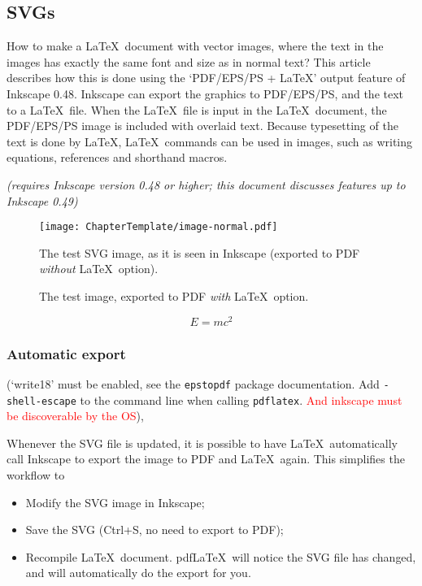 \subsection{SVGs}
How to make a \LaTeX\ document with vector images, where the text in the images
has exactly the same font and size as in normal text? This article describes how
this is done using the `PDF/EPS/PS + LaTeX' output feature of Inkscape 0.48.
Inkscape can export the graphics to PDF/EPS/PS, and the text to a \LaTeX\ file.
When the \LaTeX\ file is input in the \LaTeX\ document, the PDF/EPS/PS image is
included with overlaid text. Because typesetting of the text is done by \LaTeX,
\LaTeX\ commands can be used in images, such as writing equations, references
and shorthand macros.

\emph{(requires Inkscape version 0.48 or higher; this document discusses features up to Inkscape 0.49)}

\begin{figure}
    \centering
      \texttt{[image: ChapterTemplate/image-normal.pdf]}
      \caption{The test SVG image, as it is seen in Inkscape (exported to PDF \emph{without} \LaTeX\ option).}
      \label{fig:normal}
\end{figure}

\begin{figure}
\centering
    
    \caption{The test image, exported to PDF \emph{with} \LaTeX\ option.}
    \label{fig:pdflatex}
\end{figure}

\begin{equation}
    \label{eq:emc2}
    E = mc^{2}
\end{equation}

\subsubsection{Automatic export}

(`write18' must be enabled, see the {\small\verb|epstopdf|} package
documentation. Add {\small\verb|-shell-escape|} to the command line when calling
{\small\verb|pdflatex|}. \textcolor{red}{And inkscape must be discoverable by the
OS}),

Whenever the SVG file is updated, it is possible to have \LaTeX\ automatically call Inkscape to export the image to PDF and \LaTeX\ again. This simplifies the workflow to
\begin{itemize}
	\item Modify the SVG image in Inkscape;
	\item Save the SVG (Ctrl+S, no need to export to PDF);
	\item Recompile \LaTeX\ document. pdf\LaTeX\ will notice the SVG file has changed, and will automatically do the export for you.
\end{itemize}


